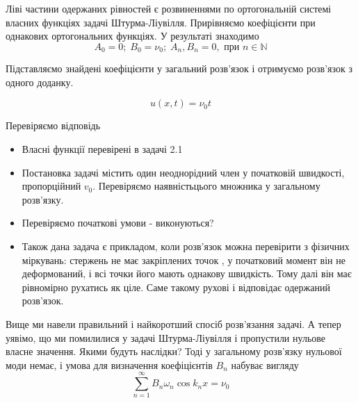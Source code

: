 Ліві частини одержаних рівностей є розвиненнями по ортогональній системі власних функціях задачі Штурма-Ліувілля. Прирівняємо коефіцієнти при однакових ортогональних функціях.  У результаті знаходимо  \[A_0=0;\;B_0 = \nu_0;\; A_n, B_n = 0, \text{ при } n \in \mathbb{N}\] 

Підставляємо знайдені коефіцієнти у загальний розв'язок і отримуємо розв'язок з одного доданку.

\begin{equation}
    u (x,t) = \nu_0 t 
\end{equation}

Перевіряємо відповідь

\begin{itemize}
    \item Власні функції перевірені в задачі 2.1
    \item Постановка задачі містить один неоднорідний член у початковій швидкості, пропорційний $v_0$. Перевіряємо наявністьцього множника у загальному розв'язку.
    \item Перевіряємо початкові умови - виконуються?

\item Також дана задача є прикладом, коли розв'язок можна перевірити з фізичних міркувань: стержень не має закріплених точок , у початковий момент він не деформований, і всі точки його мають однакову швидкість. Тому далі він має рівномірно рухатись як ціле. Саме такому рухові і відповідає одержаний розв'язок. 
\end{itemize}
 
 Вище ми навели правильний і найкоротший спосіб розв'язання задачі. А тепер уявімо, що ми помилилися у задачі Штурма-Ліувілля і пропустили нульове власне значення. Якими будуть наслідки? Тоді у загальному розв'язку нульової моди немає, і умова для визначення коефіцієнтів $B_n$ набуває вигляду 
\begin{equation} \label{sol-init-pos0}
    \sum^{\infty}_{n=1} B_n \omega_n \cos k_nx = \nu_0     
\end{equation}

